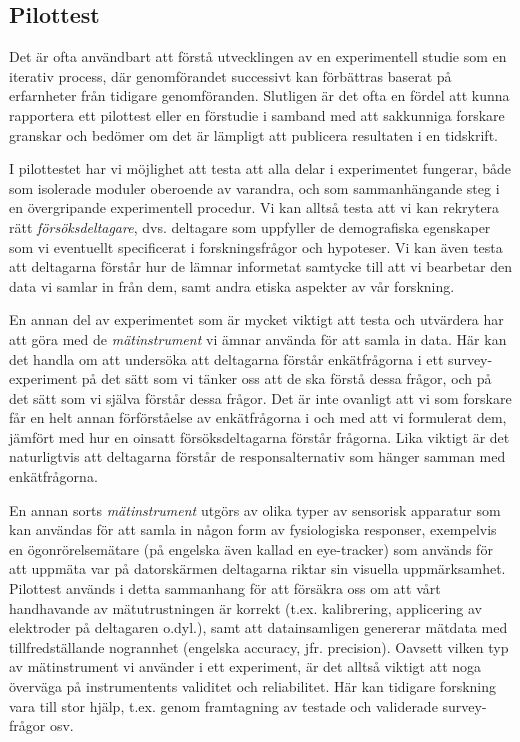 \documentclass[
]{book}
\begin{document}
\hypertarget{sub07.1.3}{%
\subsection{Pilottest}\label{sub07.1.3}}

Det är ofta användbart att förstå utvecklingen av en experimentell studie som en iterativ process, där genomförandet successivt kan förbättras baserat på erfarnheter från tidigare genomföranden. Slutligen är det ofta en fördel att kunna rapportera ett pilottest eller en förstudie i samband med att sakkunniga forskare granskar och bedömer om det är lämpligt att publicera resultaten i en tidskrift.

I pilottestet har vi möjlighet att testa att alla delar i experimentet fungerar, både som isolerade moduler oberoende av varandra, och som sammanhängande steg i en övergripande experimentell procedur. Vi kan alltså testa att vi kan rekrytera rätt \emph{försöksdeltagare}, dvs. deltagare som uppfyller de demografiska egenskaper som vi eventuellt specificerat i forskningsfrågor och hypoteser. Vi kan även testa att deltagarna förstår hur de lämnar informetat samtycke till att vi bearbetar den data vi samlar in från dem, samt andra etiska aspekter av vår forskning.

En annan del av experimentet som är mycket viktigt att testa och utvärdera har att göra med de \emph{mätinstrument} vi ämnar använda för att samla in data. Här kan det handla om att undersöka att deltagarna förstår enkätfrågorna i ett survey-experiment på det sätt som vi tänker oss att de ska förstå dessa frågor, och på det sätt som vi själva förstår dessa frågor. Det är inte ovanligt att vi som forskare får en helt annan förförståelse av enkätfrågorna i och med att vi formulerat dem, jämfört med hur en oinsatt försöksdeltagarna förstår frågorna. Lika viktigt är det naturligtvis att deltagarna förstår de responsalternativ som hänger samman med enkätfrågorna.

En annan sorts \emph{mätinstrument} utgörs av olika typer av sensorisk apparatur som kan användas för att samla in någon form av fysiologiska responser, exempelvis en ögonrörelsemätare (på engelska även kallad en eye-tracker) som används för att uppmäta var på datorskärmen deltagarna riktar sin visuella uppmärksamhet. Pilottest används i detta sammanhang för att försäkra oss om att vårt handhavande av mätutrustningen är korrekt (t.ex. kalibrering, applicering av elektroder på deltagaren o.dyl.), samt att datainsamligen genererar mätdata med tillfredställande nogrannhet (engelska accuracy, jfr. precision). Oavsett vilken typ av mätinstrument vi använder i ett experiment, är det alltså viktigt att noga överväga på instrumentents validitet och reliabilitet. Här kan tidigare forskning vara till stor hjälp, t.ex. genom framtagning av testade och validerade survey-frågor osv.
\end{document}
